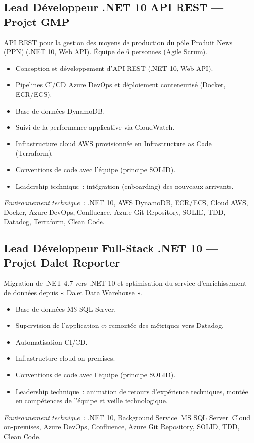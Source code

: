\documentclass[10pt,a4paper]{article}
\begin{document}
\subsection*{Lead Développeur .NET 10 API REST --- Projet GMP}
\color{darkgray}
API REST pour la gestion des moyens de production du pôle Produit News (PPN) (.NET 10, Web API). Équipe de 6 personnes (Agile Scrum).
\begin{itemize}
  \item Conception et développement d'API REST (.NET 10, Web API).
  \item Pipelines CI/CD Azure DevOps et déploiement conteneurisé (Docker, ECR/ECS).
  \item Base de données DynamoDB.
  \item Suivi de la performance applicative via CloudWatch.
  \item Infrastructure cloud AWS provisionnée en Infrastructure as Code (Terraform).
  \item Conventions de code avec l'équipe (principe SOLID).
  \item Leadership technique~: intégration (onboarding) des nouveaux arrivants.
\end{itemize}
\textit{Environnement technique~:} .NET 10, AWS DynamoDB, ECR/ECS, Cloud AWS, Docker, Azure DevOps, Confluence, Azure Git Repository, SOLID, TDD, Datadog, Terraform, Clean Code.

\vspace{6pt}

\subsection*{Lead Développeur Full-Stack .NET 10 --- Projet Dalet Reporter}
\color{darkgray}
Migration de .NET 4.7 vers .NET 10 et optimisation du service d'enrichissement de données depuis « Dalet Data Warehouse ».
\begin{itemize}
  \item Base de données MS SQL Server.
  \item Supervision de l'application et remontée des métriques vers Datadog.
  \item Automatisation CI/CD.
  \item Infrastructure cloud on-premises.
  \item Conventions de code avec l'équipe (principe SOLID).
  \item Leadership technique~: animation de retours d'expérience techniques, montée en compétences de l'équipe et veille technologique.
\end{itemize}
\textit{Environnement technique~:} .NET 10, Background Service, MS SQL Server, Cloud on-premises, Azure DevOps, Confluence, Azure Git Repository, SOLID, TDD, Clean Code.
\end{document}
